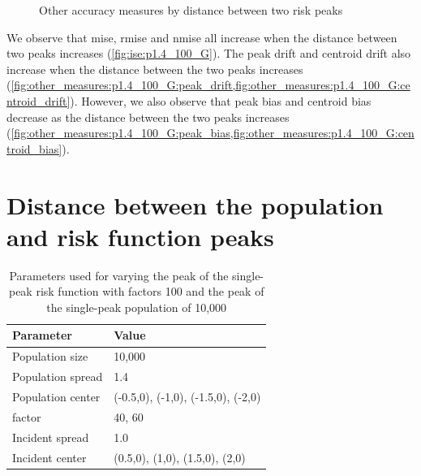 \begin{figure}[htbp]
\begin{subfigure}[b]{0.24\textwidth}
        \caption{}
        \label{fig:other_measures:p1.4_100_G:centroid_drift}
    \end{subfigure}
    \caption{Other accuracy measures by distance between two risk peaks}
    \label{fig:other_measures:p1.4_100_G}
\end{figure}

We observe that \gls{mise}, \gls{rmise} and \gls{nmise} all increase when the distance between two peaks increases (\cref{fig:ise:p1.4_100_G}).
The \gls{peak drift} and \gls{centroid drift} also increase when the distance between the two peaks increases (\cref{fig:other_measures:p1.4_100_G:peak_drift,fig:other_measures:p1.4_100_G:centroid_drift}).
However, we also observe that \gls{peak bias} and \gls{centroid bias} decrease as the distance between the two peaks increases (\cref{fig:other_measures:p1.4_100_G:peak_bias,fig:other_measures:p1.4_100_G:centroid_bias}).


\section{Distance between the population and risk function peaks}
\label{sec:ise:p1.4_Gap_risk}

\begin{table}[htbp]
    \centering
    \begin{tabular}{ll}
        \toprule
        Parameter & Value \\
        \midrule
        Population size & 10,000 \\
        Population \gls{spread} & 1.4 \\
        Population center & (-0.5,0), (-1,0), (-1.5,0), (-2,0) \\
        \Gls{factor} & 40, 60 \\
        Incident \gls{spread} & 1.0 \\
        Incident center & (0.5,0), (1,0), (1.5,0), (2,0) \\
        \bottomrule
    \end{tabular}
    \caption{Parameters used for varying the peak of the single-peak risk function with \glspl{factor} 100 and the peak of the single-peak population of 10,000}
    \label{tab:params:p1.4_100_Gap_risk}
\end{table}

